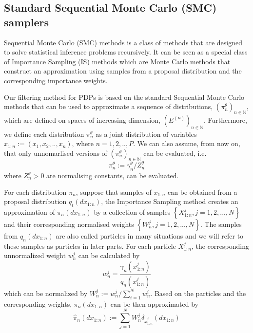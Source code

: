 \documentclass[12pt,a4paper]{article}
\begin{document}
\subsection{Standard Sequential Monte Carlo (SMC) samplers}
Sequential Monte Carlo (SMC) methods is a class of methods that are designed to solve statistical inference problems recursively. It can be seen as a special class of Importance Sampling (IS) methods which are Monte Carlo methods that construct an approximation using samples from a proposal distribution and the corresponding importance weights. 

Our filtering method for PDPs is based on the standard Sequential Monte Carlo methods that can be used to approximate a sequence of distributions, $(\pi_n^{\theta})_{n \in \mathbb{N}}$, which are defined on spaces of increasing dimension, $\left(E^{(n)}\right)_{n \in \mathbb{N}}$. Furthermore, we define each distribution $\pi_n^{\theta}$ as a joint distribution of variables $x_{1:n}:= (x_1,x_2,..,x_n)$, where $n = 1,2,..,P$.
We can also assume, from now on, that only unnomarlised versions of $(\pi_n^{\theta})_{n \in \mathbb{N}}$ can be evaluated, i.e.
$$\pi_n^{\theta} := \gamma_n^{\theta}/Z_n^{\theta}$$
where $Z_n^{\theta} >0$ are normalising constants, can be evaluated.

For each distribution $\pi_n$, suppose that samples of $x_{1:n}$ can be obtained from a proposal distribution $q_t(dx_{1:n})$, the Importance Sampling method creates an approximation of $\pi_n(dx_{1:n})$ by a collection of samples $\left\{X_{1:n}^j, j=1,2,...,N\right\}$ and their corresponding normalised weights $\left\{W_n^j, j= 1,2,...,N\right\}$. The samples from $q_n(dx_{1:n})$ are also called particles in many situations and we will refer to these samples as particles in later parts. For each particle $X_{1:n}^j$, the corresponding unnormalized weight $w_n^j$ can be calculated by \begin{equation}
    \label{Standard SMC -  IS unnormalized weight}
    w_n^j = \frac{\gamma_n\left(x_{1:n}^j\right)}{q_n\left(x_{1:n}^j\right)}
\end{equation}
which can be normalized by $W_n^j := w_n^j/\sum_{i=1}^{N}w_n^i$. Based on the particles and the corresponding weights, $\pi_n(dx_{1:n})$ can be then approximated by 
\begin{equation}
    \label{Standard SMC - IS target approx}
    \hat{\pi}_n(dx_{1:n}) := \sum_{j=1}^{N} W_n^j \delta_{x_{1:n}^j}(dx_{1:n})
\end{equation}
\end{document}

